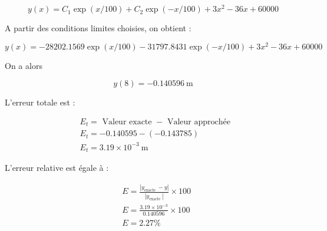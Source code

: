 \documentclass[10pt]{article}
\begin{document}
\[
y(x)=C_{1} \exp (x / 100)+C_{2} \exp (-x / 100)+3 x^{2}-36 x+60000
\]

A partir des conditions limites choisies, on obtient :

\[
y(x)=-28202.1569 \exp (x / 100)-31797.8431 \exp (-x / 100)+3 x^{2}-36 x+60000
\]

On a alors

\[
y(8)=-0.140596 \mathrm{~m}
\]

L'erreur totale est :

\[
\begin{aligned}
& E_{t}=\text { Valeur exacte }- \text { Valeur approchée } \\
& E_{t}=-0.140595-(-0.143785) \\
& E_{t}=3.19 \times 10^{-3} \mathrm{~m}
\end{aligned}
\]

L'erreur relative est égale à :

\[
\begin{aligned}
& E=\frac{\left|y_{\text {exacte }}-y\right|}{\left|y_{\text {exacte }}\right|} \times 100 \\
& E=\frac{3.19 \times 10^{-3}}{0.140596} \times 100 \\
& E=2.27 \%
\end{aligned}
\]
\end{document}
